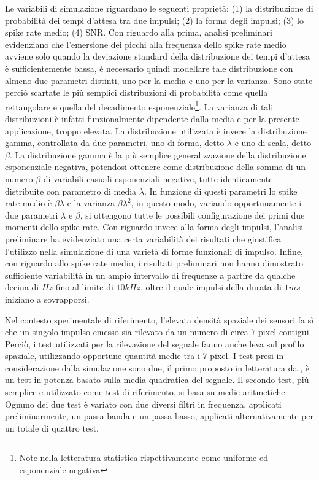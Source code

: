 Le variabili di simulazione riguardano le seguenti proprietà: (1) la distribuzione di probabilità dei tempi d'attesa tra due impulsi; (2) la forma degli impulsi; (3) lo spike rate medio; (4) SNR. Con riguardo alla prima, analisi preliminari evidenziano che l'emersione dei picchi alla frequenza dello spike rate medio avviene solo quando la deviazione standard della distribuzione dei tempi d'attesa è sufficientemente bassa, è necessario quindi modellare tale distribuzione con almeno due parametri distinti, uno per la media e uno per la varianza. Sono state perciò scartate le più semplici distribuzioni di probabilità come quella rettangolare e quella del decadimento esponenziale\footnote{Note nella letteratura statistica rispettivamente come uniforme ed esponenziale negativa}. La varianza di tali distribuzioni è infatti funzionalmente dipendente dalla media e per la presente applicazione, troppo elevata. La distribuzione utilizzata è invece la distribuzione gamma, controllata da due parametri, uno di forma, detto $\lambda$ e uno di scala, detto $\beta$. La distribuzione gamma è la più semplice generalizzazione della distribuzione esponenziale negativa, potendosi ottenere come distribuzione della somma di un numero $\beta$ di variabili casuali esponenziali negative, tutte identicamente distribuite con parametro di media $\lambda$. In funzione di questi parametri lo spike rate medio è $\beta\lambda$ e la varianza $\beta\lambda^{2}$, in questo modo, variando opportunamente i due parametri $\lambda$ e $\beta$, si ottengono tutte le possibili configurazione dei primi due momenti dello spike rate. Con riguardo invece alla forma degli impulsi, l'analisi preliminare ha evidenziato una certa variabilità dei risultati che giustifica l'utilizzo nella simulazione di una varietà di forme funzionali di impulso. Infine, con riguardo allo spike rate medio, i risultati preliminari non hanno dimostrato sufficiente variabilità in un ampio intervallo di frequenze a partire da qualche decina di $Hz$ fino al limite di $10kHz$, oltre il quale impulsi della durata di $1ms$ iniziano a sovrapporsi.

Nel contesto sperimentale di riferimento, l'elevata densità spaziale dei sensori fa sì che un singolo impulso emesso sia rilevato da un numero di circa $7$ pixel contigui. Perciò, i test utilizzati per la rilevazione del segnale fanno anche leva sul profilo spaziale, utilizzando opportune quantità medie tra i 7 pixel. I test presi in considerazione dalla simulazione sono due, il primo proposto in letteratura da \cite{Lambacher2011}, è un test in potenza basato sulla media quadratica del segnale. Il secondo test, più semplice e utilizzato come test di riferimento, si basa su medie aritmetiche. Ognuno dei due test è variato con due diversi filtri in frequenza, applicati preliminarmente, un passa banda e un passa basso, applicati alternativamente per un totale di quattro test.

